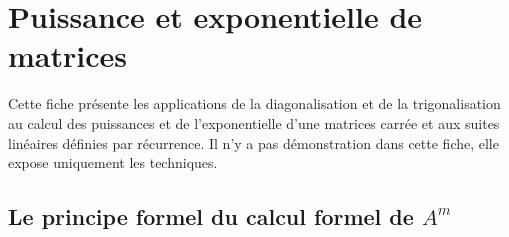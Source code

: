\documentclass[12pt,a4paper]{book}
\begin{document}
  
 \chapter{Puissance et exponentielle de matrices} 
 \begin{tcolorbox}[colback=col3,colframe=col4,leftrule=5pt,toprule=0pt,rightrule=0pt,bottomrule=0pt,arc=0pt,outer arc=0pt,top=12pt]
        Cette fiche présente les applications de la diagonalisation et de la trigonalisation au calcul des puissances et de l'exponentielle d'une matrices carrée et aux suites linéaires définies par récurrence. Il n'y a pas démonstration dans cette fiche, elle expose uniquement les techniques.
 \end{tcolorbox}
 \section{Le principe formel du calcul formel de $A^m$}
\end{document}
